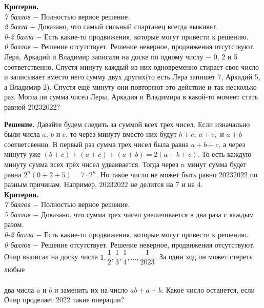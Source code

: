 \textbf{Критерии.} \\
\textit{7 баллов} $-$ Полностью верное решение. \\
\textit{2 балла} $-$ Доказано, что самый сильный спартанец всегда выживет. \\
\textit{0-2 балла} $-$ Есть какие-то продвижения, которые могут привести к решению. \\ 
\textit{0 баллов} $-$ Решение отсутствует. Решение неверное, продвижения отсутствуют. \\ 


 Лера, Аркадий и Владимир записали на доске по одному числу $-$ 0, 2 и 5 соответственно. Спустя минуту каждый из них одновременно стирает свое число и записывает вместо него сумму двух других(то есть Лера запишет 7, Аркадий 5, а Владимир 2). Спустя ещё минуту они повторяют это действие и так несколько раз. Могла ли сумма чисел Леры, Аркадия и Владимира в какой-то момент стать равной 20232022? \par 

\textbf{Решение.} Давайте будем следить за суммой всех трех чисел. Если изначально были числа $a, \ b$ и $c$, то через минуту вместо них будут $b+c, \ a+c,$ и $a+b$ соответсвенно. В первый раз сумма трех чисел была равна $a+b+c$, а через минуту уже $(b+c) + (a+c) + (a+b) = 2(a+b+c)$. То есть каждую минуту сумма всех трёх чисел удваивается. Тогда через $n$ минут сумма будет равна $2^n(0+2+5) = 7\cdot2^n$. Но такое число не может быть равно $20232022$ по разным причинам. Например, 20232022 не делится на 7 и на 4.\\

\textbf{Критерии.} \\
\textit{7 баллов} $-$ Полностью верное решение. \\
\textit{5 баллов} $-$ Доказано, что сумма трех чисел увеличивается в два раза с каждым разом. \\
\textit{0-2 балла} $-$ Есть какие-то продвижения, которые могут привести к решению. \\ 
\textit{0 баллов} $-$ Решение отсутствует. Решение неверное, продвижения отсутствуют. \\ 

 Очир выписал на доску числа $1, \dfrac{1}{2}, \dfrac{1}{3}, \dfrac{1}{4}, \dotsc, \dfrac{1}{2023}$. За один ход он может стереть любые 
\\
\\
два числа $a$ и $b$ и заменить их на число $ab+a+b$. Какое число останется, если Очир проделает 2022 такие операции? \par 

